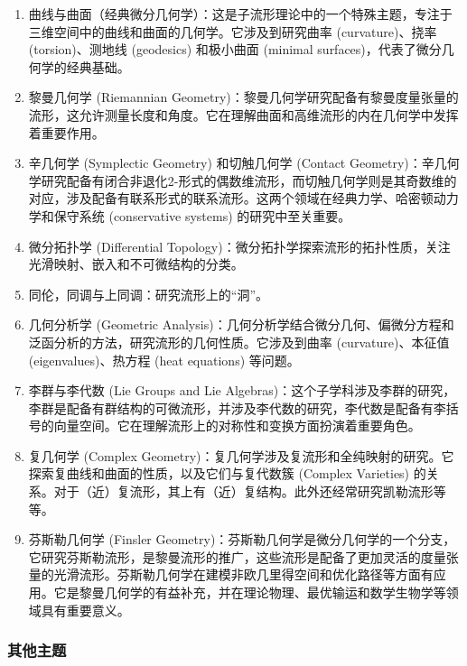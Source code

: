 \begin{enumerate}
\item 曲线与曲面（经典微分几何学）：这是子流形理论中的一个特殊主题，专注于三维空间中的曲线和曲面的几何学。它涉及到研究曲率 (curvature)、挠率 (torsion)、测地线 (geodesics) 和极小曲面 (minimal surfaces)，代表了微分几何学的经典基础。

\item 黎曼几何学 (Riemannian Geometry)：黎曼几何学研究配备有黎曼度量张量的流形，这允许测量长度和角度。它在理解曲面和高维流形的内在几何学中发挥着重要作用。

\item 辛几何学 (Symplectic Geometry) 和切触几何学 (Contact Geometry)：辛几何学研究配备有闭合非退化2-形式的偶数维流形，而切触几何学则是其奇数维的对应，涉及配备有联系形式的联系流形。这两个领域在经典力学、哈密顿动力学和保守系统 (conservative systems) 的研究中至关重要。

\item 微分拓扑学 (Differential Topology)：微分拓扑学探索流形的拓扑性质，关注光滑映射、嵌入和不可微结构的分类。

\item 同伦，同调与上同调：研究流形上的“洞”。

\item 几何分析学 (Geometric Analysis)：几何分析学结合微分几何、偏微分方程和泛函分析的方法，研究流形的几何性质。它涉及到曲率 (curvature)、本征值 (eigenvalues)、热方程 (heat equations) 等问题。

\item 李群与李代数 (Lie Groups and Lie Algebras)：这个子学科涉及李群的研究，李群是配备有群结构的可微流形，并涉及李代数的研究，李代数是配备有李括号的向量空间。它在理解流形上的对称性和变换方面扮演着重要角色。

\item 复几何学 (Complex Geometry)：复几何学涉及复流形和全纯映射的研究。它探索复曲线和曲面的性质，以及它们与复代数簇 (Complex Varieties) 的关系。对于（近）复流形，其上有（近）复结构。此外还经常研究凯勒流形等等。

\item 芬斯勒几何学 (Finsler Geometry)：芬斯勒几何学是微分几何学的一个分支，它研究芬斯勒流形，是黎曼流形的推广，这些流形是配备了更加灵活的度量张量的光滑流形。芬斯勒几何学在建模非欧几里得空间和优化路径等方面有应用。它是黎曼几何学的有益补充，并在理论物理、最优输运和数学生物学等领域具有重要意义。
\end{enumerate}


\subsubsection{其他主题}

